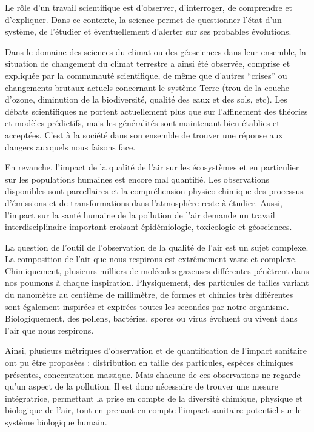 Le rôle d'un travail scientifique est d'observer, d'interroger, de comprendre et d'expliquer. 
Dans ce contexte, la science permet de questionner l'état d'un système, de l'étudier et
éventuellement d'alerter sur ses probables évolutions.

Dans le domaine des sciences du climat ou des géosciences dans leur ensemble, la situation
de changement du climat terrestre a ainsi été observée, comprise et expliquée
par la communauté scientifique, de même que d'autres ``crises'' ou changements brutaux
actuels concernant le système Terre (trou de la couche d'ozone, diminution de la
biodiversité, qualité des eaux et des sols, etc).
Les débats scientifiques ne portent actuellement plus que sur l'affinement des théories et
modèles prédictifs, mais les généralités sont maintenant bien établies et acceptées. C'est
à la société dans son ensemble de trouver une réponse aux dangers auxquels nous faisons
face.

En revanche, l'impact de la qualité de l'air sur les écosystèmes et en particulier sur les
populations humaines est encore mal quantifié. Les observations disponibles sont
parcellaires et la compréhension physico-chimique des processus d'émissions et de
transformations dans l'atmosphère reste à étudier. Aussi, l'impact sur la santé
humaine de la pollution de l'air demande un travail interdisciplinaire important croisant
épidémiologie, toxicologie et géosciences.

La question de l'outil de l'observation de la qualité de l'air est un sujet complexe. La
composition de l'air que nous respirons est extrêmement vaste et complexe. Chimiquement, plusieurs
milliers de molécules gazeuses différentes pénètrent dans nos poumons à chaque inspiration.
Physiquement, des particules de tailles variant du nanomètre au centième de millimètre, de
formes et chimies très différentes sont également inspirées et expirées toutes les
secondes par notre organisme. Biologiquement, des pollens, bactéries, spores ou virus
évoluent ou vivent dans l'air que nous respirons.

Ainsi, plusieurs métriques d'observation et de quantification de l'impact sanitaire ont pu
être proposées : distribution en taille des particules, espèces chimiques présentes,
concentration massique.
Mais chacune de ces observations ne regarde qu'un aspect de la pollution. Il est donc
nécessaire de trouver une mesure intégratrice, permettant la prise en compte de la
diversité chimique, physique et biologique de l'air, tout en prenant en compte l'impact
sanitaire potentiel sur le système biologique humain.

